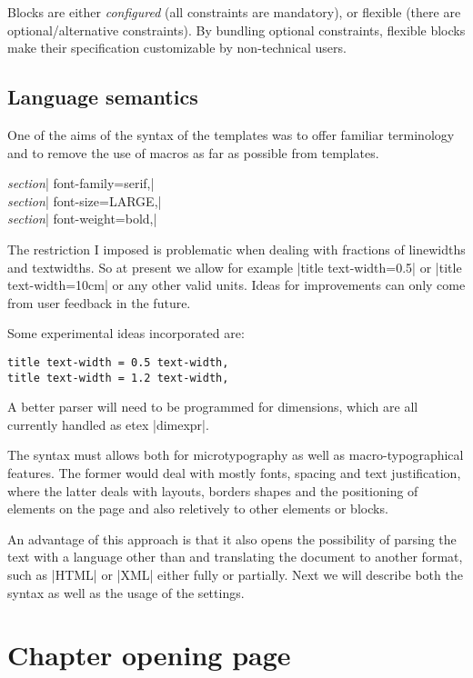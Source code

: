 Blocks are either \emph{configured} (all constraints are mandatory), or flexible (there are optional/alternative constraints). By bundling optional constraints, flexible blocks make their specification customizable by non-technical users. 

\subsection{Language semantics}

One of the aims of the syntax of the templates was to offer familiar terminology and to remove the use
of \tex macros as far as possible from templates. 
\medskip

{\parindent0pt

 \textit{section}| font-family=serif,|\\
 \textit{section}| font-size=LARGE,|\\
 \textit{section}| font-weight=bold,|\\
}

The restriction I imposed is problematic when dealing with fractions of linewidths and textwidths. So
at present we allow for example |title text-width=0.5\texwidth| or |title text-width=10cm| or any other valid units. Ideas for improvements can only come from user feedback in the future.

Some experimental ideas incorporated are:

\begin{verbatim}
title text-width = 0.5 text-width,
title text-width = 1.2 text-width,
\end{verbatim}

A better parser will need to be programmed for dimensions, which are all currently handled as etex |dimexpr|. 

The syntax must allows both for microtypography as well as macro-typographical features. The former would deal with mostly fonts, spacing and text justification, where the latter deals with layouts, borders shapes and the positioning of elements on the page and also reletively to other elements or blocks.

An advantage of this approach is that it also opens the possibility of parsing the text with a language other than \tex and translating the document to another format, such as |HTML| or |XML| either fully or partially. Next we will describe both the syntax as well as the usage of the settings.

\section{Chapter opening page}

